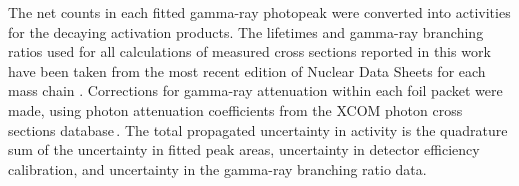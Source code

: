 The net  counts in each fitted gamma-ray photopeak were converted into  activities for the decaying  activation products.
% 
% 
% 
The   lifetimes and gamma-ray branching ratios  used for all calculations of measured cross sections reported in this work  have been taken from the most recent edition of  Nuclear Data Sheets for each  mass chain
\cite{Singh2015a,Chen2011a,Wu2000,Burrows2007,Burrows2006,Burrows2008,Wang2017,Dong2015,Dong2014,JUNDE2008787,Junde2011,Bhat1998,Nesaraja2010,Browne2013,Zuber20151,NICHOLS2012973,ERJUN2001,Singh2007}.
Corrections for gamma-ray attenuation within each foil packet were made, using  photon attenuation coefficients from the XCOM photon cross sections database\,\cite{berger2011xcom}.
The total propagated uncertainty in  activity is the quadrature sum of the uncertainty in  fitted peak areas, uncertainty in detector efficiency calibration, and uncertainty in the gamma-ray branching ratio data.




